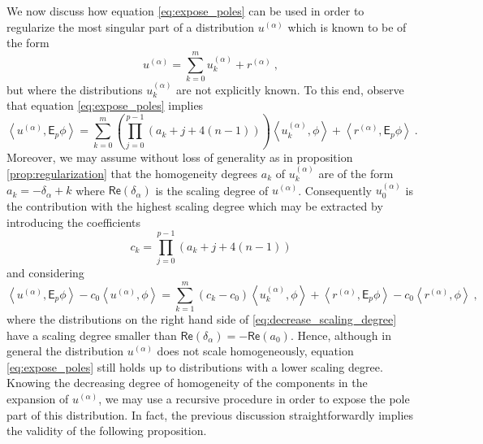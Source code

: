 \documentclass[11pt]{book}
\renewcommand{\Re}{\mathsf{Re}}
\newcommand{\sm}[1]{\left\langle#1\right\rangle}
\newcommand{\Esf}{\mathsf{E}}
\theoremstyle{break}
\begin{document}
We now discuss how equation \eqref{eq:expose_poles} can be used in order to regularize the most singular part of a distribution $u^{(\alpha)}$ which is known to be of the form
%
\begin{equation*}
u^{(\alpha)} = \sum_{k=0}^m u^{(\alpha)}_k + r^{(\alpha)} \ ,
\end{equation*}
%
but where the distributions $u^{(\alpha)}_k$ are not explicitly known. To this end, observe that equation \eqref{eq:expose_poles} implies
%
\begin{equation*}
\sm{ u^{(\alpha)} , \Esf_p \phi } = \sum_{k=0}^m \left( \prod_{j=0}^{p-1} (a_k+j+4(n-1)) \right) \sm{ u^{(\alpha)}_k , \phi } + \sm{ r^{(\alpha)} , \Esf_p \phi } \ .
\end{equation*}
%
Moreover, we may assume without loss of generality as in proposition \ref{prop:regularization} that the homogeneity degrees $a_k$ of $u^{(\alpha)}_k$ are of the form $a_k = -\delta_\alpha + k$ where $\Re(\delta_\alpha)$ is the scaling degree of $u^{(\alpha)}$. Consequently $u^{(\alpha)}_0$ is the contribution with the highest scaling degree which may be extracted by introducing the coefficients
%
\begin{equation*}
c_k = \prod_{j=0}^{p-1} \left(a_k+j+4(n-1)\right) 
\end{equation*}
%
and considering
%
\begin{equation}
\sm{ u^{(\alpha)} , \Esf_p \phi } - c_0 \sm{ u^{(\alpha)} , \phi } = \sum_{k=1}^m (c_k-c_0) \sm{ u^{(\alpha)}_k , \phi } + \sm{ r^{(\alpha)} , \Esf_p \phi } - c_0 \sm{ r^{(\alpha)}, \phi } \ ,
\label{eq:decrease_scaling_degree}
\end{equation}
%
where the distributions on the right hand side of \eqref{eq:decrease_scaling_degree} have a scaling degree smaller than $\Re(\delta_\alpha) = - \Re (a_0)$. Hence, although in general the distribution $u^{(\alpha)}$ does not scale homogeneously, equation \eqref{eq:expose_poles} still holds up to distributions with a lower scaling degree. Knowing the decreasing degree of homogeneity of the components in the expansion of $u^{(\alpha)}$, we may use a recursive procedure in order to expose the pole part of this distribution. In fact, the previous discussion straightforwardly implies the validity of the following proposition.
\end{document}
